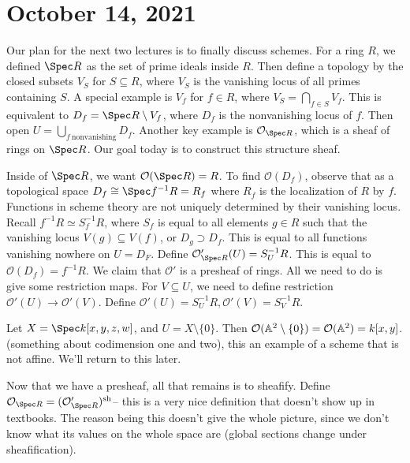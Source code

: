 \section{October 14, 2021} 
Our plan for the next two lectures is to finally discuss schemes. For a ring $R$, we defined $\Spec R$ as the set of prime ideals inside $R$. Then define a topology by the closed subsets $V_S$ for $S\subseteq R$, where $V_S$ is the vanishing locus of all primes containing $S$. A special example is $V_f$ for $f \in R$, where $V_S = \bigcap_{f \in S} V_f$. This is equivalent to $D_f = \Spec R \setminus V_f$, where $D_f$ is the nonvanishing locus of $f$. Then open $U= \bigcup_{f \ \text{nonvanishing} } D_f$. Another key example is $\mathcal{O} _{\Spec R}$, which is a sheaf of rings on $\Spec R$. Our goal today is to construct this structure sheaf.

Inside of $\Spec R$, we want $\mathcal{O} (\Spec R)=R$. To find $\mathcal{O} (D_f)$, observe that as a topological space $D_f \cong \Spec f ^{-1} R= R_f$ where $R_f$ is the localization of $R$ by $f$. Functions in scheme theory are not uniquely determined by their vanishing locus. Recall $f^{-1} R \simeq  S ^{-1} _f R$, where $S_f$ is equal to all elements $g \in R$ such that the vanishing locus $V(g) \subseteq V(f)$, or $D_g \supset D_f$. This is equal to all functions vanishing nowhere on $U=D_F$. Define $\mathcal{O} '_{\Spec R}(U)= S^{-1}_UR$. This is equal to $\mathcal{O} (D_f)= f^{-1} R$. We claim that $\mathcal{O} '$ is a presheaf of rings.
All we need to do is give some restriction maps. For $V \subseteq U$, we need to define restriction $\mathcal{O} '(U) \to \mathcal{O} '(V)$. Define $\mathcal{O} '(U) = S^{-1}_U R, \mathcal{O} '(V)= S^{-1}_VR$.
\begin{example}
    Let $X=\Spec k[x,y,z,w]$, and $U= X \setminus \{0\} $. Then $\mathcal{O} (\mathbb{A} ^2 \setminus \{0\} )= \mathcal{O} (\mathbb{A}^2)=k[x,y]$. (something about codimension one and two), this an example of a scheme that is not affine. We'll return to this later.
\end{example}

Now that we have a presheaf, all that remains is to sheafify. Define $\mathcal{O} _{\Spec R}= ( \mathcal{O} '_{\Spec R})^{\mathrm{sh}}$-- this is a very nice definition that doesn't show up in textbooks. The reason being this doesn't give the whole picture, since we don't know what its values on the whole space are (global sections change under sheafification). 

